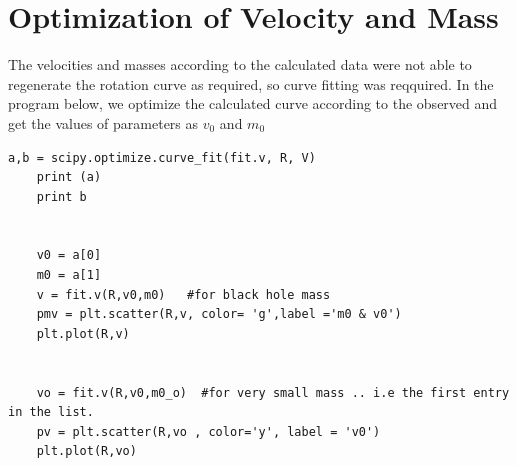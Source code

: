 \section{Optimization of Velocity and Mass}
The velocities and masses according to the calculated data were not able to regenerate the rotation curve as required, so curve fitting was reqquired. In the program below, we optimize the calculated curve according to the observed and get the values of parameters as $v_{0}$ and $m_{0}$
\begin{verbatim}
a,b = scipy.optimize.curve_fit(fit.v, R, V)
    print (a)
    print b


    v0 = a[0]
    m0 = a[1]
    v = fit.v(R,v0,m0)   #for black hole mass
    pmv = plt.scatter(R,v, color= 'g',label ='m0 & v0')
    plt.plot(R,v)


    vo = fit.v(R,v0,m0_o)  #for very small mass .. i.e the first entry in the list.
    pv = plt.scatter(R,vo , color='y', label = 'v0')
    plt.plot(R,vo)
\end{verbatim}





